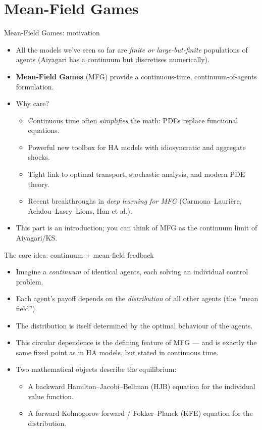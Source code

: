 \documentclass[10pt,english,aspectratio=169]{beamer}
\begin{document}

\section{Mean-Field Games}

\begin{frame}{Mean-Field Games: motivation}
\begin{itemize}
\item All the models we've seen so far are \emph{finite or large-but-finite} populations of agents (Aiyagari has a continuum but discretises numerically).
\medskip
\item \textbf{Mean-Field Games} (MFG) provide a continuous-time, continuum-of-agents formulation.
\medskip
\item Why care?
  \begin{itemize}
  \item Continuous time often \emph{simplifies} the math: PDEs replace functional equations.
  \item Powerful new toolbox for HA models with idiosyncratic and aggregate shocks.
  \item Tight link to optimal transport, stochastic analysis, and modern PDE theory.
  \item Recent breakthroughs in \emph{deep learning for MFG} (Carmona--Lauri\`ere, Achdou--Lasry--Lions, Han et al.).
  \end{itemize}
\medskip
\item This part is an introduction; you can think of MFG as the continuum limit of Aiyagari/KS.
\end{itemize}
\end{frame}

\begin{frame}{The core idea: continuum + mean-field feedback}
\begin{itemize}
\item Imagine a \emph{continuum} of identical agents, each solving an individual control problem.
\medskip
\item Each agent's payoff depends on the \emph{distribution} of all other agents (the ``mean field'').
\medskip
\item The distribution is itself determined by the optimal behaviour of the agents.
\medskip
\item This circular dependence is the defining feature of MFG --- and is exactly the same fixed point as in HA models, but stated in continuous time.
\medskip
\item Two mathematical objects describe the equilibrium:
  \begin{itemize}
  \item A backward Hamilton--Jacobi--Bellman (HJB) equation for the individual value function.
  \item A forward Kolmogorov forward / Fokker--Planck (KFE) equation for the distribution.
  \end{itemize}
\end{itemize}
\end{frame}
\end{document}
